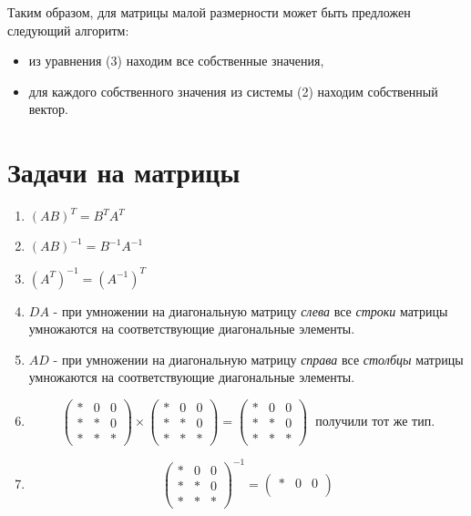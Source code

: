 \documentclass[a4paper,11pt]{article}
\begin{document}
Таким образом, для матрицы малой размерности может быть предложен следующий алгоритм:
\begin{itemize}
  \item из уравнения (3) находим все собственные значения,
  \item для каждого собственного значения из системы (2) находим собственный вектор.
\end{itemize}

\section{Задачи на матрицы}
\begin{enumerate}
  \item $(AB)^T = B^T A^T$
  \item $(AB)^{-1} = B^{-1}A^{-1}$
  \item $(A^T)^{-1} = (A^{-1})^T$
  \item $DA$ - при умножении на диагональную матрицу \textit{слева} все \textit{строки} матрицы умножаются на соответствующие диагональные элементы.
  \item $AD$ - при умножении на диагональную матрицу \textit{справа} все \textit{столбцы} матрицы умножаются на соответствующие диагональные элементы.
  \item
    \[\begin{pmatrix}
      * & 0 & 0 \\
      * & * & 0 \\
      * & * & *
    \end{pmatrix} \times
    \begin{pmatrix}
      * & 0 & 0 \\
      * & * & 0 \\
      * & * & *
    \end{pmatrix} =
    \begin{pmatrix}
      * & 0 & 0 \\
      * & * & 0 \\
      * & * & *
    \end{pmatrix} \hspace{7pt} \text{получили тот же тип.}\]
  \item
    \[\begin{pmatrix}
    * & 0 & 0 \\
    * & * & 0 \\
    * & * & *
    \end{pmatrix}^{-1} =
    \begin{pmatrix}
      * & 0 & 0 \\

\end{pmatrix}\]
\end{enumerate}
\end{document}
